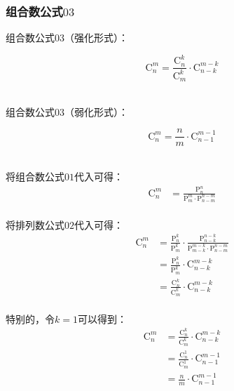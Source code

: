\documentclass[UTF8]{ctexart}
\begin{document}
\subsubsection{组合数公式$03$}
    组合数公式$03$（强化形式）：
    \begin{large}
        \begin{equation*}
            \mathrm{C}_n^m=\frac{\mathrm{C}_n^k}{\mathrm{C}_m^k}\cdot\mathrm{C}_{n-k}^{m-k}
        \end{equation*}
    \end{large}\\
    组合数公式$03$（弱化形式）：
    \begin{large}
        \begin{equation*}
            \mathrm{C}_n^m=\frac{n}{m}\cdot\mathrm{C}_{n-1}^{m-1}
        \end{equation*}
    \end{large}\\
    将组合数公式$01$代入可得：
    \setcounter{equation}{0}
    \begin{align}
        \mathrm{C}_n^m
        &=\frac{\mathrm{P}_n^n}{\mathrm{P}_m^m\cdot\mathrm{P}_{n-m}^{n-m}}
    \end{align}\\
    将排列数公式$02$代入可得：
    \begin{align}
        \mathrm{C}_n^m
        &=\frac{\mathrm{P}_n^k}{\mathrm{P}_m^k}\cdot\frac{\mathrm{P}_{n-k}^{n-k}}{\mathrm{P}_{m-k}^{m-k}\cdot\mathrm{P}_{n-m}^{n-m}}\\[3mm]
        &=\frac{\mathrm{P}_n^k}{\mathrm{P}_m^k}\cdot\mathrm{C}_{n-k}^{m-k}\\[3mm]
        &=\frac{\mathrm{C}_n^k}{\mathrm{C}_m^k}\cdot\mathrm{C}_{n-k}^{m-k}
    \end{align}\\
    特别的，令$k=1$可以得到：
    \begin{align}
        \mathrm{C}_n^m
        &=\frac{\mathrm{C}_n^k}{\mathrm{C}_m^k}\cdot\mathrm{C}_{n-k}^{m-k}\\[3mm]
        &=\frac{\mathrm{C}_n^1}{\mathrm{C}_m^1}\cdot\mathrm{C}_{n-1}^{m-1}\\[3mm]
        &=\frac{n}{m}\cdot\mathrm{C}_{n-1}^{m-1}
    \end{align}

\newpage
\end{document}
